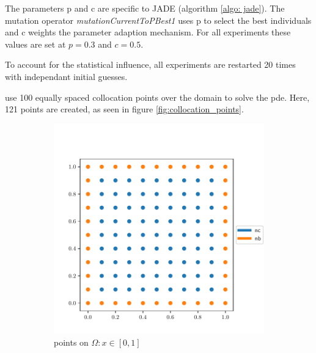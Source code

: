 \documentclass[./\jobname.tex]{subfiles}
\begin{document}
The parameters p and c are specific to JADE (algorithm \ref{algo: jade}). The mutation operator \textit{mutationCurrentToPBest1} uses p to select the best individuals and c weights the parameter adaption mechanism. For all experiments these values are set at $p=0.3$ and $c=0.5$. 

To account for the statistical influence, all experiments are restarted 20 times with independant initial guesses. 

\cite{chaquet_using_2019} use 100 equally spaced collocation points over the domain to solve the \gls{pde}. Here, 121 points are created, as seen in figure \ref{fig:collocation_points}. 

\begin{figure}[h]
	\centering
	\begin{subfigure}[b]{0.5\linewidth}
		\centering
		\includegraphics[width=1\textwidth]{../img/pdf/testbed_small_domain.pdf}
		\caption{points on $\Omega: x\in [0,1]$}
		\label{fig:collocation_points_domain_small}
	\end{subfigure}%
	\begin{subfigure}[b]{0.5\linewidth}
		\centering

\end{subfigure}
\end{figure}
\end{document}

